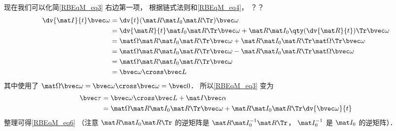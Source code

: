 现在我们可以化简\autoref{RBEqM_eq3} 右边第一项， 根据链式法则和\autoref{RBEqM_eq4}， ？？
\begin{equation}
\begin{aligned}
\dv{\mat I}{t}\bvec\omega &= \dv{t}(\mat R \mat I_0 \mat R\Tr)\bvec\omega\\
&= \dv{\mat R}{t} \mat I_0 \mat R\Tr \bvec\omega + \mat R \mat I_0 \qty(\dv{\mat R}{t})\Tr \bvec\omega\\
&= \mat \Omega \mat R \mat I_0 \mat R\Tr \bvec\omega + \mat R \mat I_0 \mat R\Tr \mat \Omega\Tr \bvec\omega\\
&= \mat \Omega \mat R \mat I_0 \mat R\Tr \bvec\omega - \mat R \mat I_0 \mat R\Tr \mat \Omega \bvec\omega\\
&= \mat \Omega \mat R \mat I_0 \mat R\Tr \bvec\omega\\
&= \bvec \omega \cross \bvec L
\end{aligned}
\end{equation}
其中使用了 $\mat \Omega \bvec\omega = \bvec\omega \cross \bvec\omega = \bvec 0$． 所以\autoref{RBEqM_eq3} 变为
\begin{equation}
\begin{aligned}
\bvec\tau &= \bvec\omega \cross \bvec L + \mat I \bvec\alpha\\
&= \mat \Omega \mat R \mat I_0 \mat R\Tr \bvec\omega + \mat R \mat I_0 \mat R\Tr \dv{\bvec\omega}{t}
\end{aligned}
\end{equation}
整理可得\autoref{RBEqM_eq6} （注意 $\mat R \mat I_0 \mat R\Tr$ 的逆矩阵是 $\mat R \mat I_0^{-1} \mat R\Tr$， $\mat I_0^{-1}$ 是 $\mat I_0$ 的逆矩阵）．%
